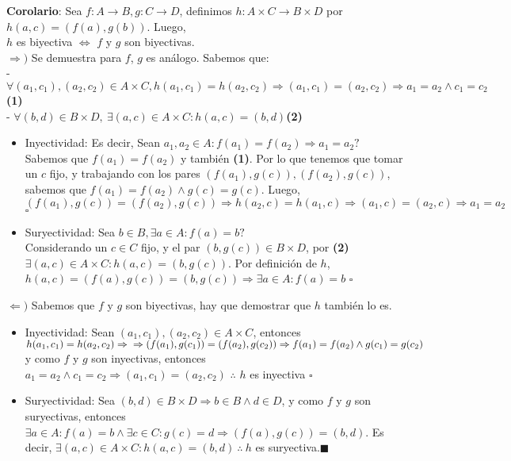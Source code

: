 \documentclass[11pt,a4paper]{article}
\newcommand*{\QEDA}{\null\nobreak\hfill\ensuremath{\blacksquare}}
\newcommand*{\QEDB}{\null\nobreak\hfill\ensuremath{\square}}
\begin{document}
\noindent \textbf{Corolario}: Sea $f : A \rightarrow B, g : C \rightarrow D$, definimos $h : A \times C \rightarrow B \times D$ por $h(a,c) = (f(a),g(b))$. Luego, \\ $h$ es biyectiva $\iff$ $f$ y $g$ son biyectivas.\\
$\Rightarrow)$ Se demuestra para $f$, $g$ es an\'alogo. Sabemos que: \\ 
\indent - $\forall (a_1,c_1), (a_2,c_2) \in A \times C, h(a_1, c_1) = h(a_2,c_2) \Rightarrow (a_1,c_1) = (a_2,c_2) \Rightarrow a_1 = a_2 \land c_1 = c_2$ \hfill \textbf{(1)}\\
\indent - $\forall (b,d) \in B \times D,\ \exists (a,c) \in A \times C : h(a,c) = (b,d)$\hfill \textbf{(2)}
\begin{itemize}
\item Inyectividad: Es decir, Sean $a_1,a_2 \in A : f(a_1) = f(a_2) \Rightarrow a_1 = a_2?$\\
Sabemos que $f(a_1) = f(a_2)$ y tambi\'en \textbf{(1)}. Por lo que tenemos que tomar un $c$ fijo, y trabajando con los pares $(f(a_1),g(c)), (f(a_2),g(c))$, sabemos que $f(a_1) = f(a_2) \land g(c) = g(c)$. Luego, $(f(a_1),g(c)) = (f(a_2),g(c)) \Rightarrow h(a_2, c) = h(a_1, c) \Rightarrow (a_1,c) = (a_2,c) \Rightarrow a_1 = a_2$ \QEDB
\item Suryectividad: Sea $b \in B, \exists a \in A : f(a) = b?$\\
Considerando un $c \in C$ fijo, y el par $(b,g(c)) \in B \times D$, por \textbf{(2)} $\exists (a,c) \in A \times C : h(a,c) = (b,g(c))$. Por definici\'on de $h$, $h(a,c) = (f(a),g(c)) = (b,g(c)) \Rightarrow \exists a \in A : f(a) = b$ \QEDB
\end{itemize}
$\Leftarrow)$ Sabemos que $f$ y $g$ son biyectivas, hay que demostrar que $h$ tambi\'en lo es.
\begin{itemize}
\item Inyectividad: Sean $(a_1,c_1), (a_2,c_2) \in A \times C$, entonces $h(a_1,c_1) = h(a_2,c_2) \Rightarrow \\ \Rightarrow (f(a_1),g(c_1)) = (f(a_2),g(c_2)) \Rightarrow f(a_1) = f(a_2) \land g(c_1) = g(c_2)$ y como $f$ y $g$ son inyectivas, entonces $a_1 = a_2 \land c_1 = c_2 \Rightarrow (a_1, c_1) = (a_2,c_2)$ $\therefore$ $h$ es inyectiva \QEDB
\item Suryectividad: Sea $(b,d) \in B \times D \Rightarrow b \in B \land d \in D$, y como $f$ y $g$ son suryectivas, entonces $\exists a \in A : f(a) = b \land \exists c \in C : g(c) = d \Rightarrow (f(a),g(c)) = (b,d)$. Es decir, $\exists (a,c) \in A \times C : h(a,c) = (b,d)\ \therefore\ h$ es suryectiva.\QEDA\\
\end{itemize}
\newpage
\end{document}
